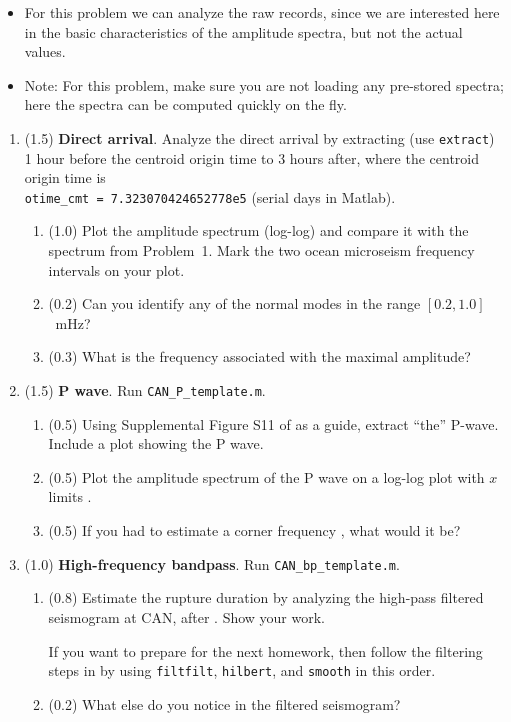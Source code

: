 \documentclass[11pt,titlepage,fleqn]{article}
\begin{document}
\begin{itemize}
\item For this problem we can analyze the raw records, since we are interested here in the basic characteristics of the amplitude spectra, but not the actual values.

\item Note: For this problem, make sure you are not loading any pre-stored spectra; here the spectra can be computed quickly on the fly.
\end{itemize}

\begin{enumerate}
\item (1.5) {\bf Direct arrival}. Analyze the direct arrival by extracting (use \verb+extract+) 1 hour before the centroid origin time to 3 hours after, where the centroid origin time is \\ \verb+otime_cmt = 7.323070424652778e5+ (serial days in Matlab).

\begin{enumerate}
\item (1.0) Plot the amplitude spectrum (log-log) and compare it with the spectrum from Problem~1. Mark the two ocean microseism frequency intervals on your plot.
\item (0.2) Can you identify any of the normal modes in the range $[0.2,1.0]$~mHz?
\item (0.3) What is the frequency associated with the maximal amplitude?
\end{enumerate}


\item (1.5) {\bf P wave}. Run \verb+CAN_P_template.m+.
%
\begin{enumerate}
\item (0.5) Using Supplemental Figure S11 of \citet{Ammon2005} as a guide, extract ``the'' P-wave. Include a plot showing the P wave.
\item (0.5) Plot the amplitude spectrum of the P wave on a log-log plot with $x$ limits .
\item (0.5) If you had to estimate a corner frequency \citep[][p.~267]{SteinWysession}, what would it be?
\end{enumerate}


\item (1.0) {\bf High-frequency bandpass}. Run \verb+CAN_bp_template.m+.
%
\begin{enumerate}
\item (0.8) Estimate the rupture duration by analyzing the high-pass filtered seismogram at CAN, after \citet{Ni2005}. Show your work.

If you want to prepare for the next homework, then follow the filtering steps in \citet{Ni2005} by using \verb+filtfilt+, \verb+hilbert+, and \verb+smooth+ in this order.

\item (0.2) What else do you notice in the filtered seismogram?
\end{enumerate}

\end{enumerate}
\end{document}
